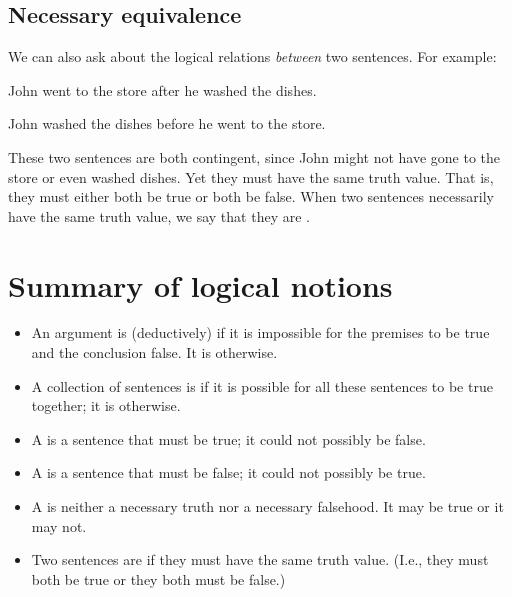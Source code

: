 \subsection{Necessary equivalence}

We can also ask about the logical relations \emph{between} two sentences. For example:
\begin{earg}
\item[] John went to the store after he washed the dishes.
\item[] John washed the dishes before he went to the store.
\end{earg}
These two sentences are both contingent, since John might not have gone to the store or even washed dishes. Yet they must have the same truth value. That is, they must either both be true or both be false. When two sentences necessarily have the same truth value, we say that they are .


\section*{Summary of logical notions}

\begin{itemize}
\item[] An argument is (deductively)  if it is impossible for the premises to be true and the conclusion false. It is  otherwise.

\item[] A collection of sentences is  if it is possible for all these sentences to be true together; it is  otherwise.

\item[] A  is a sentence that must be true; it could not possibly be false.

\item[] A  is a sentence that must be false; it could not possibly be true.

\item[] A  is neither a necessary truth nor a necessary falsehood. It may be true or it may not.

\item[] Two sentences are  if they must have the same truth value. (I.e., they must both be true or they both must be false.)
\end{itemize}

